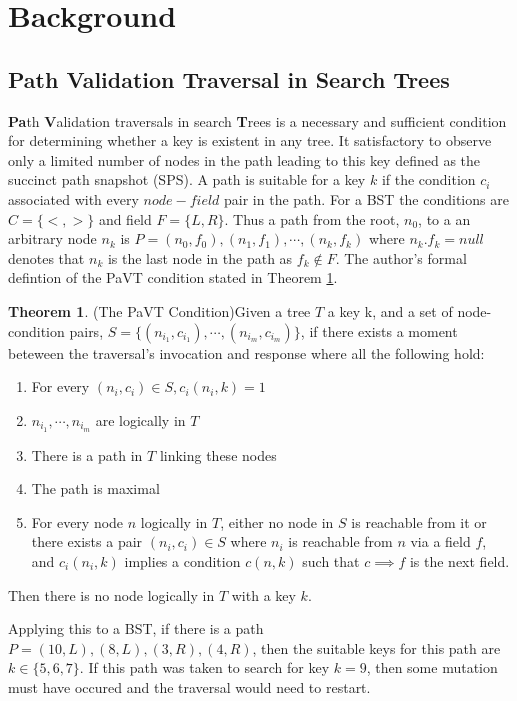 \documentclass[conference]{IEEEtran}
\theoremstyle{definition}
\theoremstyle{theorem}
\newtheorem{theorem}{Theorem}[section]
\begin{document}
\section{Background}
\subsection{Path Validation Traversal in Search Trees}
\textbf{Pa}th \textbf{V}alidation traversals in search \textbf{T}rees is a necessary and sufficient condition for determining whether a key is existent in any tree. It satisfactory to observe only a limited number of nodes in the path leading to this key defined as the succinct path snapshot (SPS). A path is suitable for a key $k$ if the condition $c_i$ associated with every $node-field$ pair in the path. For a BST the conditions are $C=\{<,>\}$ and field $F=\{L, R\}$. Thus a path from the root, $n_0$, to a an arbitrary node $n_k$ is $P=(n_0, f_0), (n_1, f_1),\cdots, (n_k, f_k)$ where $n_k.f_k = null$ denotes that $n_k$ is the last node in the path as $f_k\not \in F$. The author's formal defintion of the PaVT condition stated in Theorem \ref{thm:pavt}.

\begin{theorem} {(The PaVT Condition)}\label{thm:pavt}
Given a tree $T$ a key k, and a set of node-condition pairs, $S=\{(n_{i_1}, c_{i_1}),\cdots, (n_{i_m}, c_{i_m})\}$, if there exists a moment beteween the traversal's invocation and response where all the following hold:
\begin{enumerate}
\item For every $(n_i, c_i) \in  S, c_i(n_i, k) = 1$
\item $n_{i_1},\cdots, n_{i_m}$ are logically in $T$
\item There is a path in $T$ linking these nodes
\item The path is maximal
\item For every node $n$ logically in $T$, either no node in $S$ is reachable from it or there exists a pair $(n_i, c_i)\in S$ where $n_i$ is reachable from $n$ via a field $f$, and $c_i(n_i, k)$ implies a condition $c(n, k)$ such that $c \implies f$ is the next field.
\end{enumerate}
Then there is no node logically in $T$ with a key $k$.
\end{theorem}

Applying this to a BST, if there is a path $P=(10,L),(8,L),(3,R),(4,R)$, then the suitable keys for this path are $k\in\{5, 6, 7\}$. If this path was taken to search for key $k=9$, then some mutation must have occured and the traversal would need to restart.   
\end{document}
